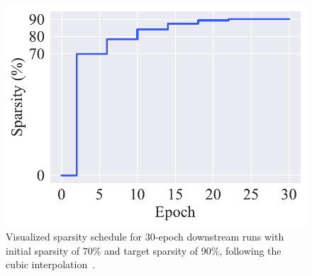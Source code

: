 \documentclass[11pt]{article}
\begin{document}
\begin{figure}[htb!]
    \centering
    \includegraphics[scale=0.5]{media/sparsity90_30ep.pdf}
    \caption{Visualized sparsity schedule for 30-epoch downstream runs with initial sparsity of 70\% and target sparsity of 90\%, following the cubic interpolation~\cite{Zhu2018ToPO}.}
    \label{fig:spars90_ep30}
\end{figure}
\end{document}
